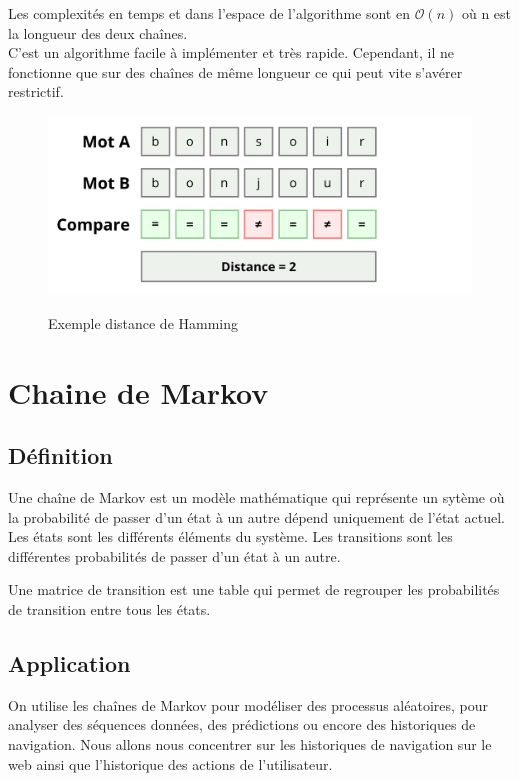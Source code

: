 \documentclass[a4paper, 11pt]{report}
\begin{document}
Les complexités en temps et dans l'espace de l'algorithme sont en $\mathcal{O}(n)$ où n est la longueur des deux chaînes. \\

C'est un algorithme facile à implémenter et très rapide. Cependant, il ne fonctionne que sur des chaînes de même longueur ce qui peut vite s'avérer restrictif.\\

\begin{figure}[H]
	\begin{center}
		{\includegraphics[height=0.4\textwidth]{images/hamming.png}}
	\end{center}
	\caption{Exemple distance de Hamming}
	\label{fig:hamming}
\end{figure}


\chapter{Chaine de Markov}
\label{Markov}
\section{Définition}

Une chaîne de Markov est un modèle mathématique qui représente un sytème où la probabilité de passer d'un état à un autre dépend uniquement de l'état actuel. Les états sont les différents éléments du système. Les transitions sont les différentes probabilités de passer d'un état à un autre. \par
Une matrice de transition est une table qui permet de regrouper les probabilités de transition entre tous les états.

\section{Application}
On utilise les chaînes de Markov pour modéliser des processus aléatoires, pour analyser des séquences données, des prédictions ou encore des historiques de navigation. Nous allons nous concentrer sur les historiques de navigation sur le web ainsi que l'historique des actions de l'utilisateur. \\
\end{document}
